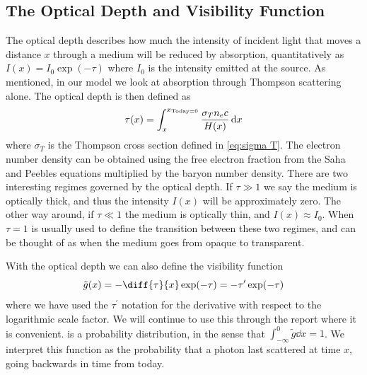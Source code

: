 \documentclass[10pt,a4paper]{article}
\begin{document}
\subsection{The Optical Depth and Visibility Function}
\label{subsec:Theory/tau and g}
The optical depth describes how much the intensity of incident light that moves a distance $x$ through a medium will be reduced by absorption, quantitatively as $I(x) = I_0 \exp(-\tau)$ where $I_0$ is the intensity emitted at the source. As mentioned, in our model we look at absorption through Thompson scattering alone. The optical depth is then defined as
\begin{equation}
    \tau(x) = \int_x^{x_{\rm{Today}=0}} \frac{\sigma_T n_e c}{H(x)}\dd{x}
    \label{eq:tau integration}
\end{equation}
where $\sigma_T$ is the Thompson cross section defined in \cref{eq:sigma T}. The electron number density can be obtained using the free electron fraction from the Saha and Peebles equations multiplied by the baryon number density. There are two interesting regimes governed by the optical depth. If $\tau \gg 1$ we say the medium is optically thick, and thus the intensity $I(x)$ will be approximately zero. The other way around, if $\tau \ll 1$ the medium is optically thin, and $I(x) \approx I_0$. When $\tau  = 1$ is usually used to define the transition between these two regimes, and can be thought of as when the medium goes from opaque to transparent.

With the optical depth we can also define the visibility function
\begin{equation}
    \tilde{g}(x) = - \diff{\tau}{x}\exp(-\tau) = -\tau^\prime \exp(-\tau)
    \label{eq:visibility function}
\end{equation}
where we have used the $\tau^\prime$ notation for the derivative with respect to the logarithmic scale factor. We will continue to use this through the report where it is convenient.  is a probability distribution, in the sense that $\int_{-\infty}^0 \tilde{g}\dd x = 1$. We interpret this function as the probability that a photon last scattered at time $x$, going backwards in time from today.
\end{document}
